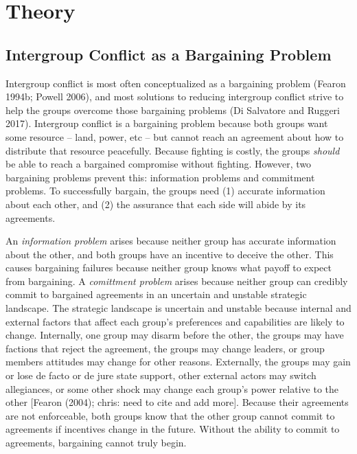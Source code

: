 \documentclass[11pt]{article}
\begin{document}
\section{Theory}\label{theory}

\subsection{Intergroup Conflict as a Bargaining
Problem}\label{intergroup-conflict-as-a-bargaining-problem}

Intergroup conflict is most often conceptualized as a bargaining problem
(Fearon 1994b; Powell 2006), and most solutions to reducing intergroup
conflict strive to help the groups overcome those bargaining problems
(Di Salvatore and Ruggeri 2017). Intergroup conflict is a bargaining
problem because both groups want some resource -- land, power, etc --
but cannot reach an agreement about how to distribute that resource
peacefully. Because fighting is costly, the groups \emph{should} be able
to reach a bargained compromise without fighting. However, two
bargaining problems prevent this: information problems and commitment
problems. To successfully bargain, the groups need (1) accurate
information about each other, and (2) the assurance that each side will
abide by its agreements.

An \emph{information problem} arises because neither group has accurate
information about the other, and both groups have an incentive to
deceive the other. This causes bargaining failures because neither group
knows what payoff to expect from bargaining. A \emph{comittment problem}
arises because neither group can credibly commit to bargained agreements
in an uncertain and unstable strategic landscape. The strategic
landscape is uncertain and unstable because internal and external
factors that affect each group's preferences and capabilities are likely
to change. Internally, one group may disarm before the other, the groups
may have factions that reject the agreement, the groups may change
leaders, or group members attitudes may change for other reasons.
Externally, the groups may gain or lose de facto or de jure state
support, other external actors may switch allegiances, or some other
shock may change each group's power relative to the other {[}Fearon
(2004); chris: need to cite and add more{]}. Because their agreements
are not enforceable, both groups know that the other group cannot commit
to agreements if incentives change in the future. Without the ability to
commit to agreements, bargaining cannot truly begin.
\end{document}
